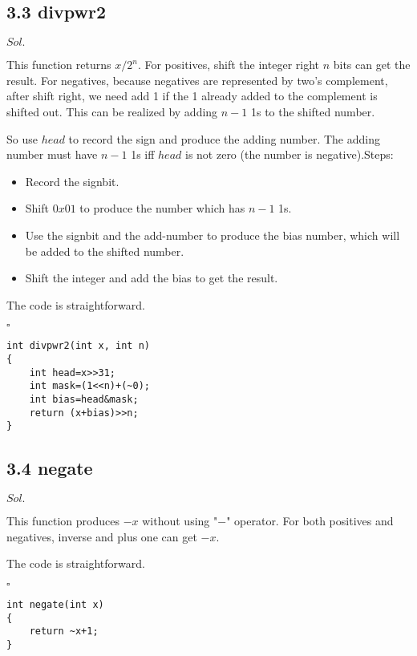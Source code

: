 \documentclass[a4paper, 11pt]{article}
\newenvironment{sol}[1] {\par \noindent $#1.$} {\par \hfill $\square$}
\begin{document}
\subsection*{3.3 divpwr2}

\begin{sol}{Sol}

This function returns $x/2^{n}$. For positives, shift the integer right $n$ bits can get the result. For negatives, because negatives are represented by two's complement, after shift right, we need add 1 if the 1 already added to the complement is shifted out. This can be realized by adding $n-1$ 1s to the shifted number.

So use $head$ to record the sign and produce the adding number. The adding number must have $n-1$ 1s iff $head$ is not zero (the number is negative).Steps:

\begin{itemize}
    \item Record the signbit.
    \item Shift $0x01$ to produce the number which has $n-1$ 1s.
    \item Use the signbit and the add-number to produce the bias number, which will be added to the shifted number.
    \item Shift the integer and add the bias to get the result.
\end{itemize}

The code is straightforward.
\end{sol}
\begin{lstlisting}
int divpwr2(int x, int n)
{
    int head=x>>31;
    int mask=(1<<n)+(~0);
    int bias=head&mask;
    return (x+bias)>>n;
}
\end{lstlisting}

\subsection*{3.4 negate}

\begin{sol}{Sol}

This function produces $-x$ without using "$-$" operator. For both positives and negatives, inverse and plus one can get $-x$.

The code is straightforward.
\end{sol}
\begin{lstlisting}
int negate(int x)
{
    return ~x+1;
}
\end{lstlisting}
\end{document}
